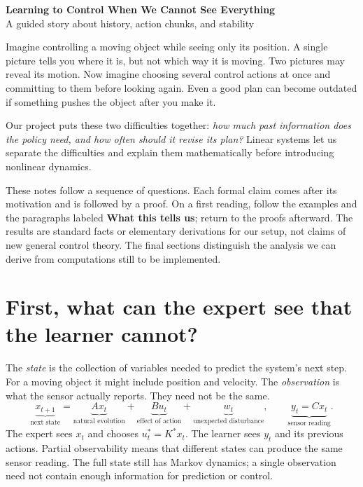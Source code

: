 \documentclass[12 pt]{article}        	%
\theoremstyle{definition}
\begin{document}
\begin{center}
{\Large\textbf{Learning to Control When We Cannot See Everything}}\\[5pt]
{\large A guided story about history, action chunks, and stability}
\end{center}

Imagine controlling a moving object while seeing only its position. A single picture tells you where it is, but not which way it is moving. Two pictures may reveal its motion. Now imagine choosing several control actions at once and committing to them before looking again. Even a good plan can become outdated if something pushes the object after you make it.

Our project puts these two difficulties together: \emph{how much past information does the policy need, and how often should it revise its plan?} Linear systems let us separate the difficulties and explain them mathematically before introducing nonlinear dynamics.

These notes follow a sequence of questions. Each formal claim comes after its motivation and is followed by a proof. On a first reading, follow the examples and the paragraphs labeled \textbf{What this tells us}; return to the proofs afterward. The results are standard facts or elementary derivations for our setup, not claims of new general control theory. The final sections distinguish the analysis we can derive from computations still to be implemented.

\section{First, what can the expert see that the learner cannot?}
The \emph{state} is the collection of variables needed to predict the system's next step. For a moving object it might include position and velocity. The \emph{observation} is what the sensor actually reports. They need not be the same.
\[
\underbrace{x_{t+1}}_{\text{next state}}
=\underbrace{Ax_t}_{\text{natural evolution}}
+\underbrace{Bu_t}_{\text{effect of action}}
+\underbrace{w_t}_{\text{unexpected disturbance}},
\qquad
\underbrace{y_t=Cx_t}_{\text{sensor reading}}.
\]
The expert sees $x_t$ and chooses $u_t^*=K^*x_t$. The learner sees $y_t$ and its previous actions. Partial observability means that different states can produce the same sensor reading. The full state still has Markov dynamics; a single observation need not contain enough information for prediction or control.
\end{document}
